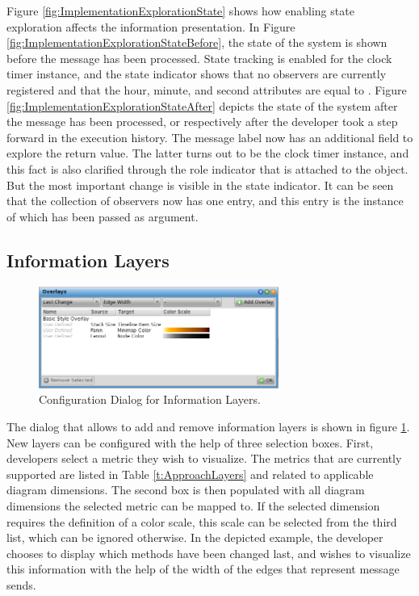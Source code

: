 Figure \ref{fig:ImplementationExplorationState} shows how enabling state exploration affects the information presentation.
In Figure \ref{fig:ImplementationExplorationStateBefore}, the state of the system is shown before the  message has been processed.
State tracking is enabled for the clock timer instance, and the state indicator shows that no observers are currently registered and that the hour, minute, and second attributes are equal to .
Figure \ref{fig:ImplementationExplorationStateAfter} depicts the state of the system after the  message has been processed, or respectively after the developer took a step forward in the execution history.
The message label now has an additional field to explore the return value.
The latter turns out to be the clock timer instance, and this fact is also clarified through the role indicator that is attached to the object.
But the most important change is visible in the state indicator.
It can be seen that the collection of observers now has one entry, and this entry is the instance of  which has been passed as argument.

\subsection{Information Layers}

\begin{figure}[tb]
	\centering
	\includegraphics[width=0.7\textwidth]{../images/04-ImplOverlays}
	\caption{Configuration Dialog for Information Layers.}
	\label{fig:ImplementationLayers}
\end{figure}

The dialog that allows to add and remove information layers is shown in figure \ref{fig:ImplementationLayers}.
New layers can be configured with the help of three selection boxes.
First, developers select a metric they wish to visualize. 
The metrics that are currently supported are listed in Table \ref{t:ApproachLayers}  and related to applicable diagram dimensions.
The second box is then populated with all diagram dimensions the selected metric can be mapped to.
If the selected dimension requires the definition of a color scale, this scale can be selected from the third list, which can be ignored otherwise.
In the depicted example, the developer chooses to display which methods have been changed last, and wishes to visualize this information with the help of the width of the edges that represent message sends.

